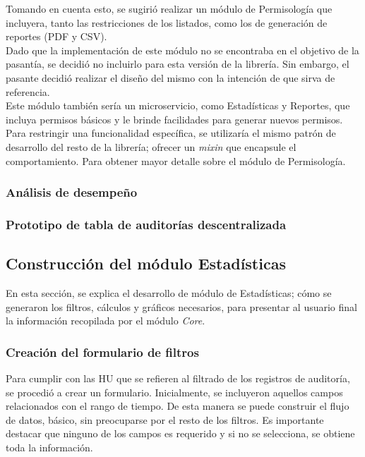 Tomando en cuenta esto, se sugirió realizar un módulo de Permisología que incluyera, tanto las restricciones de los listados, como los de generación de reportes (PDF y CSV).\\

Dado que la implementación de este módulo no se encontraba en el objetivo de la pasantía, se decidió no incluirlo para esta versión de la librería. Sin embargo, el pasante decidió realizar el diseño del mismo con la intención de que sirva de referencia. \\

Este módulo también sería un microservicio, como Estadísticas y Reportes, que incluya permisos básicos y le brinde facilidades para generar nuevos permisos. Para restringir una funcionalidad específica, se utilizaría el mismo patrón de desarrollo del resto de la librería; ofrecer un \textit{mixin} que encapsule el comportamiento. Para obtener mayor detalle sobre el módulo de Permisología.

\subsubsection{Análisis de desempeño}

\subsubsection{Prototipo de tabla de auditorías descentralizada}

\subsection{Construcción del módulo Estadísticas}

En esta sección, se explica el desarrollo de módulo de Estadísticas; cómo se generaron los filtros, cálculos y gráficos necesarios, para presentar al usuario final la información recopilada por el módulo \textit{Core}.

\subsubsection{Creación del  formulario de filtros}

Para cumplir con las HU que se refieren al filtrado de los registros de auditoría, se procedió a crear un formulario. Inicialmente, se incluyeron aquellos campos relacionados con el rango de tiempo. De esta manera se puede construir el flujo de datos, básico, sin preocuparse por el resto de los filtros. Es importante destacar que ninguno de los campos es requerido y si no se selecciona, se obtiene toda la información.\\

